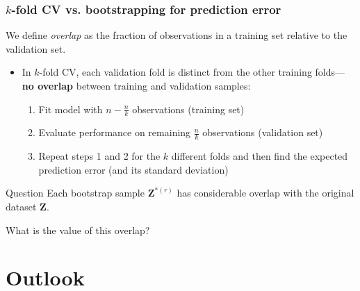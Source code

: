\documentclass[smaller]{beamer}
\newcommand{\?}{\stackrel{?}{=}}
\newcommand{\fr}{\frac}
\begin{document}








\begin{frame}
  \frametitle{$k$-fold CV  vs. bootstrapping for prediction error}
  \pause
  We define \textit{overlap} as the fraction of observations in a training set relative to the validation set.\pause
  
  \begin{itemize}[<+->]
  \item In $k$-fold CV, each validation fold is distinct from the other training folds---\pause \textbf{no overlap} between training and validation samples:\pause
    \begin{enumerate}[<+->]
    \item Fit model with $n- \fr nk$ observations (training set)
    \item Evaluate performance on remaining $\fr nk$ observations (validation set)
    \item Repeat steps 1 and 2 for the $k$ different folds and then find the expected prediction error
      (and its standard deviation)
    \end{enumerate}
  \end{itemize}
  \pause

  \begin{exampleblock}{Question}
    Each bootstrap sample $\bm Z^{*(r)}$ has considerable overlap with the original dataset $\bm Z$.\\
    \pause

    \bigskip
      
    What is the value of this overlap?
  \end{exampleblock}
\end{frame}




\section{Outlook}
\end{document}
